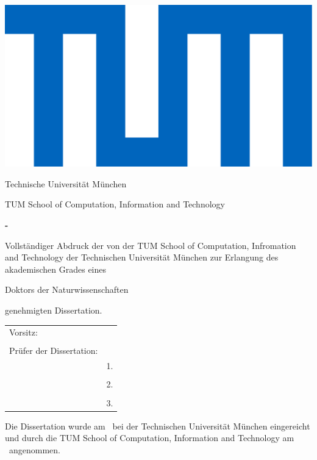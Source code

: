 \thispagestyle{empty}
\hfill
\includegraphics[height=0.1\textwidth]{assets/logo_tum.pdf}
\vspace*{0.5cm}

\begin{center}
	{\Large Technische Universit\"at M\"unchen}
\end{center}
\vspace*{0.5cm}

\begin{center}
	{\Large TUM School of Computation, Information and Technology}
\end{center}
\vspace*{0.5cm}


\begin{center}
	{
		\LARGE\textbf{\getTitle - }\par
		\vspace{0.3cm}
		\large \textbf{\getSubTitle}\par
	}
\end{center}
\vspace*{0.5cm}

\begin{center}
	{\Large \textbf{\getAuthor}}
\end{center}
\vspace*{1.0cm}

\vfill
{\setlength{\parindent}{0cm} Vollst\"andiger Abdruck der von der TUM School of Computation, Infromation and Technology der Technischen Universit\"at M\"unchen zur Erlangung des akademischen Grades eines}
\begin{center}
	{Doktors der Naturwissenschaften}
\end{center}
{genehmigten Dissertation.}
\vspace*{1cm}
\begin{table}[h]
	\centering
	\begin{tabular}{ll}
		{Vorsitz:}  & {\;\;\; \getChairman} \\
		& \\
		{Pr\"ufer der Dissertation:} & \\
		& {1. \getSupervisor} \\
		& \\	
		& {2. \getExaminer} \\
		& \\
		& {3. \getSecondExaminer} \\
	\end{tabular}
\end{table}
\vspace*{1cm}

{\setlength{\parindent}{0cm} Die Dissertation wurde am \getSubmissionDate\ bei
	der Technischen Universit\"at M\"unchen eingereicht und durch die
	TUM School of Computation, Information and Technology
	am \getAcceptanceDate\ angenommen.}

\pagestyle{empty}